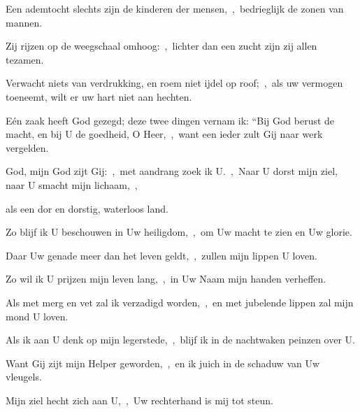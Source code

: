 \documentclass[12pt,twoside,a5paper]{article}
\begin{document}

\begin{halfparskip}
  Een ademtocht slechts zijn de kinderen der mensen,~\sep\ bedrieglijk de zonen van mannen.

  Zij rijzen op de weegschaal omhoog:~\sep\ lichter dan een zucht zijn zij allen tezamen.

  Verwacht niets van verdrukking, en roem niet ijdel op roof;~\sep\ als uw vermogen toeneemt, wilt er uw hart niet aan hechten.

  Eén zaak heeft God gezegd; deze twee dingen vernam ik: ``Bij God berust de macht, en bij U de goedheid, O  Heer,~\sep\ want een ieder zult Gij naar werk vergelden.
\end{halfparskip}



\begin{halfparskip}
  God, mijn God zijt Gij:~\sep\ met aandrang zoek ik U.~\sep\ Naar U dorst mijn ziel, naar U smacht mijn lichaam,~\sep


  als een dor en dorstig, waterloos land.

  Zo blijf ik U beschouwen in Uw heiligdom,~\sep\ om Uw macht te zien en Uw glorie.

  Daar Uw genade meer dan het leven geldt,~\sep\ zullen mijn lippen U loven.
\end{halfparskip}


\begin{halfparskip}
  Zo wil ik U prijzen mijn leven lang,~\sep\ in Uw Naam mijn handen verheffen.

  Als met merg en vet zal ik verzadigd worden,~\sep\ en met jubelende lippen zal mijn mond U loven.

  Als ik aan U denk op mijn legerstede,~\sep\ blijf ik in de nachtwaken peinzen over U.

  Want Gij zijt mijn Helper geworden,~\sep\ en ik juich in de schaduw van Uw vleugels.

  Mijn ziel hecht zich aan U,~\sep\ Uw rechterhand is mij tot steun.
\end{halfparskip}

\end{document}
